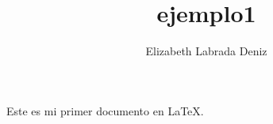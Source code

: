 \documentclass[10pt,a4paper]{article}
\author{Elizabeth Labrada Deniz}
\title{ejemplo1}
\begin{document}
Este es mi primer documento en \LaTeX.
\end{document}
